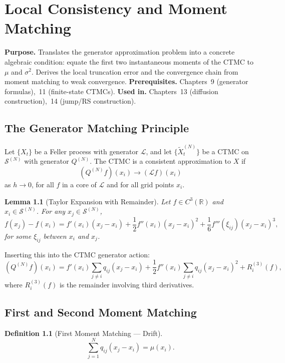 \documentclass[11pt,a4paper,openany]{book}
\theoremstyle{definition}
\newtheorem{definition}{Definition}[chapter]
\theoremstyle{plain}
\newtheorem{lemma}[theorem]{Lemma}
\theoremstyle{remark}
\newcommand{\1}{\mathbbm{1}}
\newcommand{\R}{\mathbb{R}}
\newcommand{\calL}{\mathcal{L}}
\newcommand{\calS}{\mathcal{S}}
\begin{document}
\chapter{Local Consistency and Moment Matching}

\noindent\textbf{Purpose.} Translates the generator approximation problem into a concrete algebraic condition: equate the first two instantaneous moments of the CTMC to $\mu$ and $\sigma^{2}$. Derives the local truncation error and the convergence chain from moment matching to weak convergence.
\textbf{Prerequisites.} Chapters~9 (generator formulas),~11 (finite-state CTMCs).
\textbf{Used in.} Chapters~13 (diffusion construction),~14 (jump/RS construction).

\section{The Generator Matching Principle}

Let $\{X_{t}\}$ be a Feller process with generator $\calL$, and let $\{\widetilde{X}_{t}^{(N)}\}$ be a CTMC on $\calS^{(N)}$ with generator $Q^{(N)}$. The CTMC is a consistent approximation to $X$ if
\[
(Q^{(N)} f)(x_{i}) \to (\calL f)(x_{i})
\]
as $h \to 0$, for all $f$ in a core of $\calL$ and for all grid points $x_{i}$.

\begin{lemma}[Taylor Expansion with Remainder]
Let $f \in C^{3}(\R)$ and $x_{i} \in \calS^{(N)}$. For any $x_{j} \in \calS^{(N)}$,
\[
f(x_{j}) - f(x_{i}) = f'(x_{i})(x_{j} - x_{i}) + \frac{1}{2} f''(x_{i})(x_{j} - x_{i})^{2} + \frac{1}{6} f'''(\xi_{ij})(x_{j} - x_{i})^{3},
\]
for some $\xi_{ij}$ between $x_{i}$ and $x_{j}$.
\end{lemma}

Inserting this into the CTMC generator action:
\[
(Q^{(N)} f)(x_{i}) = f'(x_{i}) \sum_{j \neq i} q_{ij} (x_{j} - x_{i}) + \frac{1}{2} f''(x_{i}) \sum_{j \neq i} q_{ij} (x_{j} - x_{i})^{2} + R_{i}^{(3)}(f),
\]
where $R_{i}^{(3)}(f)$ is the remainder involving third derivatives.

\section{First and Second Moment Matching}

\begin{definition}[First Moment Matching --- Drift]
\[
\boxed{\sum_{j=1}^{N} q_{ij} (x_{j} - x_{i}) = \mu(x_{i})}.
\]
\end{definition}
\end{document}
